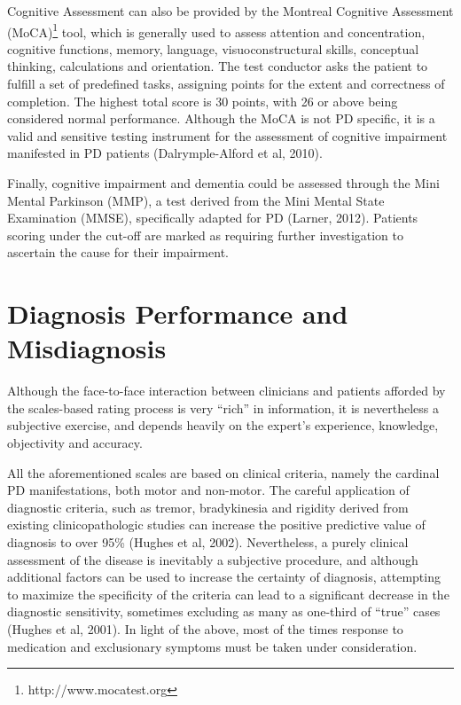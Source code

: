 Cognitive Assessment can also be provided by the Montreal Cognitive Assessment (\gls{MoCA})\footnote{http://www.mocatest.org} tool, which is generally used to assess attention and concentration, cognitive functions, memory, language, visuoconstructural skills, conceptual thinking, calculations and orientation. The test conductor asks the patient to fulfill a set of predefined tasks, assigning points for the extent and correctness of completion. The highest total score is 30 points, with 26 or above being considered normal performance. Although the \gls{MoCA} is not \gls{PD} specific, it is a valid and sensitive testing instrument for the assessment of cognitive impairment manifested in \gls{PD} patients (Dalrymple-Alford et al, 2010). 

Finally, cognitive impairment and dementia could be assessed through the Mini Mental Parkinson (\gls{MMP}), a test derived from the Mini Mental State Examination (\gls{MMSE}), specifically adapted for \gls{PD} (Larner, 2012). Patients scoring under the cut-off are marked as requiring further investigation to ascertain the cause for their impairment. 


\section{Diagnosis Performance and Misdiagnosis}
\label{sec:misdiagnosis}
Although the face-to-face interaction between clinicians and patients afforded by the scales-based rating process is very ``rich'' in information, it is nevertheless a subjective exercise, and depends heavily on the expert's experience, knowledge, objectivity and accuracy.

All the aforementioned scales are based on clinical criteria, namely the cardinal \gls{PD} manifestations, both motor and non-motor. The careful application of diagnostic criteria, such as tremor, bradykinesia and rigidity derived from existing clinicopathologic studies can increase the positive predictive value of diagnosis to over 95\% (Hughes et al, 2002). Nevertheless, a purely clinical assessment of the disease is inevitably a subjective procedure, and although additional factors can be used to increase the certainty of diagnosis, attempting to maximize the specificity of the criteria can lead to a significant decrease in the diagnostic sensitivity, sometimes excluding as many as one-third of ``true'' cases (Hughes et al, 2001). In light of the above, most of the times response to medication and exclusionary symptoms must be taken under consideration.

